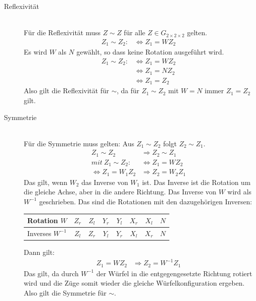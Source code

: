 \documentclass[12pt,a4paper, usenames, dvipsnames]{article}
\theoremstyle{mystyle}
\theoremstyle{definition}
\newcommand{\Gtwo}{\ensuremath{G_{2\times 2\times 2}}}
\begin{document}
\begin{description}


\item [Reflexivität] \ \\
Für die Reflexivität muss $Z \sim Z$ für alle $Z \in \Gtwo$ gelten. 
\begin{align*}
Z_1 \sim Z_2 : & \Leftrightarrow  Z_1 = WZ_2
\end{align*}
Es wird $W$ als $N$ gewählt, so dass keine Rotation ausgeführt wird.
\begin{align*}
Z_1 \sim Z_2 : & \Leftrightarrow  Z_1 = WZ_2 \\
\ & \Leftrightarrow Z_1=N Z_2 \\
\ & \Leftrightarrow Z_1 = Z_2
\end{align*}
Also gilt die Reflexivität für $\sim$, da für $Z_1 \sim Z_2$ mit $W=N$ immer $Z_1 = Z_2$ gilt.

\item [Symmetrie] \ \\
Für die Symmetrie muss gelten: Aus $Z_1 \sim Z_2$ folgt $Z_2 \sim Z_1$.
\begin{align*}
Z_1 \sim Z_2 & \Rightarrow Z_2 \sim Z_1 \\
mit \ Z_1 \sim Z_2 : & \Leftrightarrow  Z_1 = WZ_2 \\
\Leftrightarrow Z_1 = W_1 Z_2 & \Rightarrow Z_2 = W_2 Z_1
\end{align*}
Das gilt, wenn $W_2$ das Inverse von $W_1$ ist. Das Inverse ist die Rotation um die gleiche Achse, aber in die andere Richtung. 
Das Inverse von $W$ wird als $W^{-1}$ geschrieben.
Das sind die Rotationen mit den dazugehörigen Inversen:

\begin{center}
\begin{tabular}{lccccccc}
Rotation $W$ & ${Z_r}$ & ${Z_l}$ &  ${Y_r}$ & ${Y_l}$ & ${X_r}$ & ${X_l}$ & $N$ \\
\hline
Inverses \hspace*{0.1em} $W^{-1}$ & ${Z_l}$ & ${Z_r}$ &  ${Y_l}$ & ${Y_r}$ & ${X_l}$ & ${X_r}$ & $N$ \\
\end{tabular} 
\end{center}
Dann gilt: 
\begin{align*}
Z_1 = W Z_2 & \Rightarrow Z_2 = W^{-1} Z_1
\end{align*}
Das gilt, da durch $W^{-1}$ der Würfel in die entgegengesetzte Richtung rotiert wird und die Züge somit wieder die gleiche Würfelkonfiguration ergeben.
Also gilt die Symmetrie für $\sim$.



\end{description}
\end{document}
